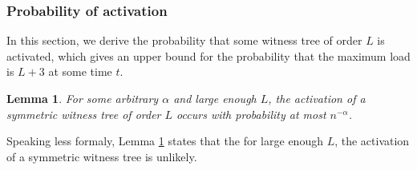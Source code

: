 \documentclass[a4paper,12pt]{article}
\newtheorem{lemma}{Lemma}
\begin{document}
\subsubsection{Probability of activation}
\label{sec:analysis:probabilitySymWT}
In this section, we derive the probability that some witness tree of order $L$ is activated, which gives an upper bound for the probability that the maximum load is $L+3$ at some time $t$. 

\begin{lemma}\label{lemma:swt:activation}
For some arbitrary $\alpha$ and large enough $L$, the activation of a symmetric witness tree of order $L$ occurs with probability at most $n^{-\alpha}$.
\end{lemma}
Speaking less formaly, Lemma \ref{lemma:swt:activation} states that the for large enough $L$, the activation of a symmetric witness tree is unlikely.
\end{document}
